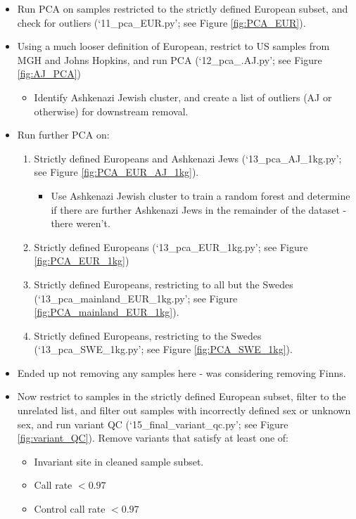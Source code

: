 \documentclass[12pt]{article}
\begin{document}
\begin{itemize}
\begin{itemize}
	\end{itemize}
	\item Run PCA on samples restricted to the strictly defined European subset, and check for outliers (`11\_pca\_EUR.py'; see Figure \ref{fig:PCA_EUR}).
	\item Using a much looser definition of European, restrict to US samples from MGH and Johns Hopkins, and run PCA (`12\_pca\_.AJ.py'; see Figure \ref{fig:AJ_PCA})
	\begin{itemize}
		\item Identify Ashkenazi Jewish cluster, and create a list of outliers (AJ or otherwise) for downstream removal.
	\end{itemize}
	\item Run further PCA on:
	\begin{enumerate}
		\item Strictly defined Europeans and Ashkenazi Jews (`13\_pca\_AJ\_1kg.py'; see Figure \ref{fig:PCA_EUR_AJ_1kg}).
		\begin{itemize}
			\item Use Ashkenazi Jewish cluster to train a random forest and determine if there are further Ashkenazi Jews in the remainder of the dataset - there weren't.
		\end{itemize} 
		\item Strictly defined Europeans (`13\_pca\_EUR\_1kg.py'; see Figure \ref{fig:PCA_EUR_1kg})
		\item Strictly defined Europeans, restricting to all but the Swedes (`13\_pca\_mainland\_EUR\_1kg.py'; see Figure \ref{fig:PCA_mainland_EUR_1kg}).
		\item Strictly defined Europeans, restricting to the Swedes (`13\_pca\_SWE\_1kg.py'; see Figure \ref{fig:PCA_SWE_1kg}).
	\end{enumerate}
	\item Ended up not removing any samples here - was considering removing Finns.
	\item Now restrict to samples in the strictly defined European subset, filter to the unrelated list, and filter out samples with incorrectly defined sex or unknown sex, and run variant QC (`15\_final\_variant\_qc.py'; see Figure \ref{fig:variant_QC}). Remove variants that satisfy at least one of:
	\begin{itemize}
		\item Invariant site in cleaned sample subset.
		\item Call rate $< 0.97$
		\item Control call rate $< 0.97$

\end{itemize}
\end{itemize}
\end{document}
